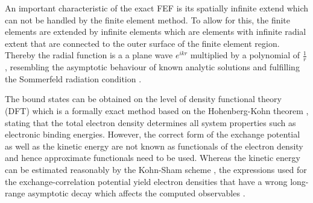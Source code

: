 An important characteristic of the exact FEF is its spatially infinite extend which can not be handled by the finite element method.
To allow for this, the finite elements are extended by infinite elements \cite{astley3, astley2, Astley,dreyer} which are elements with infinite radial extent that are connected to the outer surface of the finite element region.
Thereby the radial function is a a plane wave $e^{ikr}$ multiplied by a polynomial of $\frac 1r$, resembling the asymptotic behaviour of known analytic solutions and fulfilling the Sommerfeld radiation condition \cite{sommerfeldCond}.

The bound states can be obtained on the level of density functional theory (DFT) which is a formally exact method based on the Hohenberg-Kohn theorem \cite{HohenbergKohn}, stating that the total electron density determines all system properties such as electronic binding energies.
However, the correct form of the exchange potential as well as the kinetic energy are not known as functionals of the electron density and hence approximate functionals need to be used.
Whereas the kinetic energy can be estimated reasonably by the Kohn-Sham scheme \cite{KohnSham}, the expressions used for the exchange-correlation potential yield electron densities that have a wrong long-range asymptotic decay which affects the computed observables \cite{Koerzd1, Koerzd2, Bokareva}.
